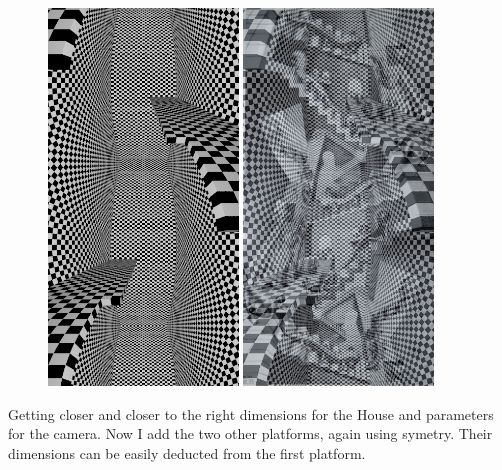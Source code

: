 \documentclass[12pt, a4paper]{article}
\begin{document}
\begin{center}
\begin{figure}[H]
\centering
\includegraphics[height=10cm]{./XL-51_7.png}
\includegraphics[height=10cm]{./checkDimensionViewPoint_4.png}\\
\end{figure}
\end{center}

Getting closer and closer to the right dimensions for the House and parameters for the camera. Now I add the two other platforms, again using symetry. Their dimensions can be easily deducted from the first platform.\\

\begin{scriptsize}
\begin{ttfamily}

\end{ttfamily}
\end{scriptsize}
\end{document}

